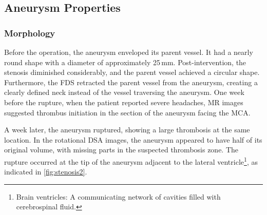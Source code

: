 \subsection{Aneurysm Properties}

\subsubsection*{Morphology}
Before the operation, the aneurysm enveloped its parent vessel. It had a nearly round shape with a diameter of approximately 25\,mm. Post-intervention, the stenosis diminished considerably, and the parent vessel achieved a circular shape. Furthermore, the FDS retracted the parent vessel from the aneurysm, creating a clearly defined neck instead of the vessel traversing the aneurysm. One week before the rupture, when the patient reported severe headaches, MR images suggested thrombus initiation in the section of the aneurysm facing the MCA\@.

A week later, the aneurysm ruptured, showing a large thrombosis at the same location. In the rotational DSA images, the aneurysm appeared to have half of its original volume, with missing parts in the suspected thrombosis zone. The rupture occurred at the tip of the aneurysm adjacent to the lateral ventricle\footnote{Brain ventricles: A communicating network of cavities filled with cerebrospinal fluid.}, as indicated in \autoref{fig:stenosis2}.

